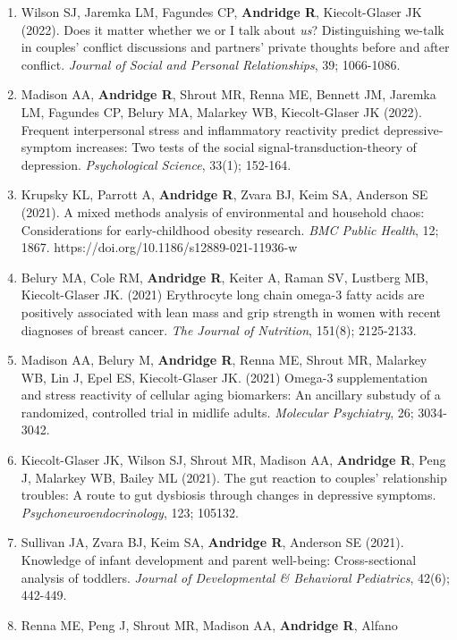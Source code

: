 \documentclass[
  english,
  letterpaper,
  DIV=11,
  numbers=noendperiod]{scrartcl}
\begin{document}
\begin{enumerate}
  \emph{Nutritional Neuroscience}, 25(12); 2650-2658.
\item
  Wilson SJ, Jaremka LM, Fagundes CP, \textbf{Andridge R},
  Kiecolt-Glaser JK (2022). Does it matter whether we or I talk about
  \emph{us}? Distinguishing we-talk in couples' conflict discussions and
  partners' private thoughts before and after conflict. \emph{Journal of
  Social and Personal Relationships}, 39; 1066-1086.
\item
  Madison AA, \textbf{Andridge R}, Shrout MR, Renna ME, Bennett JM,
  Jaremka LM, Fagundes CP, Belury MA, Malarkey WB, Kiecolt-Glaser JK
  (2022). Frequent interpersonal stress and inflammatory reactivity
  predict depressive-symptom increases: Two tests of the social
  signal-transduction-theory of depression. \emph{Psychological
  Science}, 33(1); 152-164.
\item
  Krupsky KL, Parrott A, \textbf{Andridge R}, Zvara BJ, Keim SA,
  Anderson SE (2021). A mixed methods analysis of environmental and
  household chaos: Considerations for early-childhood obesity research.
  \emph{BMC Public Health}, 12; 1867.
  https://doi.org/10.1186/s12889-021-11936-w
\item
  Belury MA, Cole RM, \textbf{Andridge R}, Keiter A, Raman SV, Lustberg
  MB, Kiecolt-Glaser JK. (2021) Erythrocyte long chain omega-3 fatty
  acids are positively associated with lean mass and grip strength in
  women with recent diagnoses of breast cancer. \emph{The Journal of
  Nutrition}, 151(8); 2125-2133.
\item
  Madison AA, Belury M, \textbf{Andridge R}, Renna ME, Shrout MR,
  Malarkey WB, Lin J, Epel ES, Kiecolt-Glaser JK. (2021) Omega-3
  supplementation and stress reactivity of cellular aging biomarkers: An
  ancillary substudy of a randomized, controlled trial in midlife
  adults. \emph{Molecular Psychiatry}, 26; 3034-3042.
\item
  Kiecolt-Glaser JK, Wilson SJ, Shrout MR, Madison AA, \textbf{Andridge
  R}, Peng J, Malarkey WB, Bailey ML (2021). The gut reaction to
  couples' relationship troubles: A route to gut dysbiosis through
  changes in depressive symptoms. \emph{Psychoneuroendocrinology}, 123;
  105132.
\item
  Sullivan JA, Zvara BJ, Keim SA, \textbf{Andridge R}, Anderson SE
  (2021). Knowledge of infant development and parent well-being:
  Cross-sectional analysis of toddlers. \emph{Journal of Developmental
  \& Behavioral Pediatrics}, 42(6); 442-449.
\item
  Renna ME, Peng J, Shrout MR, Madison AA, \textbf{Andridge R}, Alfano

\end{enumerate}
\end{document}
